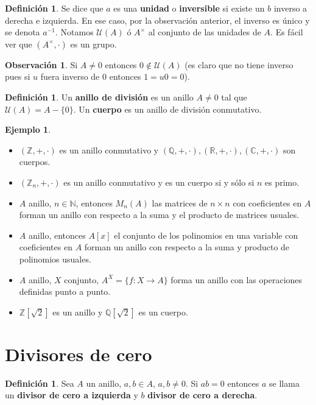 \documentclass[12pt]{book}
\theoremstyle{definition}
\newtheorem{obs}[teo]{Observación}
\newtheorem{defn}[teo]{Definición}
\newtheorem{ex}[teo]{Ejemplo}
\newcommand{\RR}{\mathbb{R}}      %
\newcommand{\ZZ}{\mathbb{Z}}      %
\newcommand{\NN}{\mathbb{N}}
\begin{document}
\begin{defn}
Se dice que $a$ es una \textbf{unidad} o \textbf{inversible} si existe un $b$ inverso a derecha e izquierda. En ese caso, por la observación anterior, el inverso es único y se denota $a^{-1}$. Notamos $\mathcal{U}(A)$ ó $A^\times$ al conjunto de las unidades de $A$. Es fácil ver que $(A^{\times},\cdot)$ es un grupo.
\end{defn}

\begin{obs}
Si $A\neq 0$ entonces $0\notin \mathcal{U}(A)$ (es claro que no tiene inverso pues si $u$ fuera inverso de $0$ entonces $1 = u0 = 0$).
\end{obs}

\begin{defn}
Un \textbf{anillo de división} es un anillo $A\neq 0$ tal que $\mathcal{U}(A) = A - \{0\}$. Un \textbf{cuerpo} es un anillo de división conmutativo.
\end{defn}

\begin{ex}
\begin{itemize}
\item $(\ZZ,+,\cdot)$ es un anillo conmutativo y $(\mathbb{Q} , +,\cdot), (\RR,+,\cdot), (\mathbb{C},+,\cdot)$ son cuerpos.
\item $(\ZZ_n,+,\cdot)$ es un anillo conmutativo y es un cuerpo si y sólo si $n$ es primo.
\item  $A$ anillo, $n\in\NN$, entonces $M_n(A)$ las matrices de $n\times n$ con coeficientes en $A$ forman un anillo con respecto a la suma y el producto de matrices usuales.
\item $A$ anillo, entonces $A[x]$ el conjunto de los polinomios en una variable con coeficientes en $A$ forman un anillo con respecto a la suma y producto de polinomios usuales.
\item $A$ anillo, $X$ conjunto, $A^X = \{f:X\to A\}$ forma un anillo con las operaciones definidas punto a punto.
\item $\mathbb{Z}[\sqrt{2}]$ es un anillo y $\mathbb{Q}[\sqrt{2}]$ es un cuerpo.
\end{itemize}
\end{ex}

\section{Divisores de cero}

\begin{defn}
Sea $A$ un anillo, $a,b\in A$, $a,b\neq 0$. Si $ab=0$ entonces $a$ se llama un \textbf{divisor de cero a izquierda} y $b$ \textbf{divisor de cero a derecha}.
\end{defn}
\end{document}

